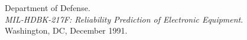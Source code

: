 \begin{thebibliography}{9}
    Department of Defense.\\
    \textit{MIL-HDBK-217F: Reliability Prediction of Electronic Equipment}.\\
    Washington, DC, December 1991.
\end{thebibliography}